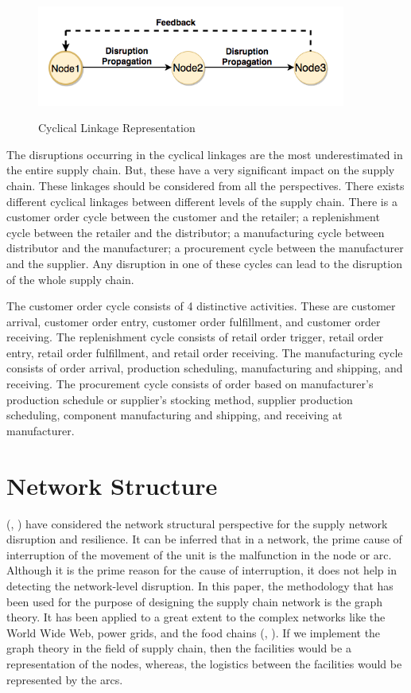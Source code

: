 \begin{figure}[H]
  \centering
  \includegraphics[width=4.0in]{figures/pdf/Cyclical-Linkage.png}\\
  \caption{Cyclical Linkage Representation}\label{Cyclical Linkage}
\end{figure}


The disruptions occurring in the cyclical linkages are the most underestimated in the entire supply chain. But, these have a very significant impact on the supply chain. These linkages should be considered from all the perspectives. There exists different cyclical linkages between different levels of the supply chain. There is a customer order cycle between the customer and the retailer; a replenishment cycle between the retailer and the distributor; a manufacturing cycle between distributor and the manufacturer; a procurement cycle between the manufacturer and the supplier. Any disruption in one of these cycles can lead to the disruption of the whole supply chain. 

The customer order cycle consists of 4 distinctive activities. These are customer arrival, customer order entry, customer order fulfillment, and customer order receiving. The replenishment cycle consists of retail order trigger, retail order entry, retail order fulfillment, and retail order receiving. The manufacturing cycle consists of order arrival, production scheduling, manufacturing and shipping, and receiving. The procurement cycle consists of order based on manufacturer's production schedule or supplier's stocking method, supplier production scheduling, component manufacturing and shipping, and receiving at manufacturer.



\newpage
\section{Network Structure}

(\citeauthor{Kim2015}, \citeyear{Kim2015}) have considered the network structural perspective for the supply network disruption and resilience. It can be inferred that in a network, the prime cause of interruption of the movement of the unit is the malfunction in the node or arc. Although it is the prime reason for the cause of interruption, it does not help in detecting the network-level disruption. In this paper, the methodology that has been used for the purpose of designing the supply chain network is the graph theory. It has been applied to a great extent to the complex networks like the World Wide Web, power grids, and the food chains (\citeauthor{gross2005graph}, \citeyear{gross2005graph}). If we implement the graph theory in the field of supply chain, then the facilities would be a representation of the nodes, whereas, the logistics between the facilities would be represented by the arcs.

